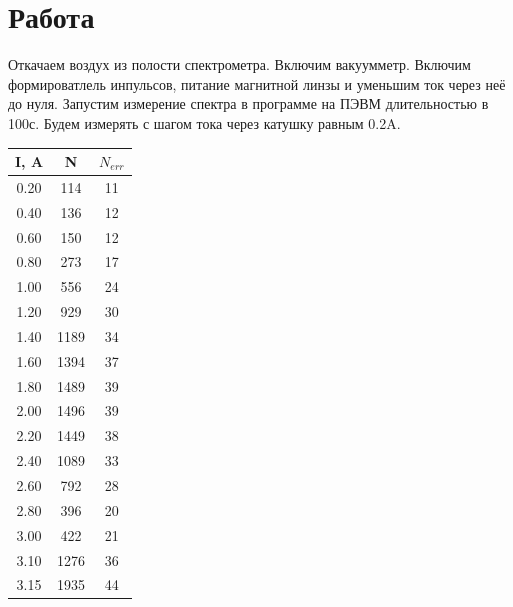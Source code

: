 \documentclass{article}
\begin{document}
\section{Работа}

Откачаем воздух из полости спектрометра. Включим вакуумметр. Включим формироватлель
инпульсов, питание магнитной линзы и уменьшим ток через неё до нуля. Запустим измерение
спектра в программе на ПЭВМ длительностью в 100с. Будем измерять с шагом тока через катушку равным 0.2A.

\begin{table}[h]
	\centering
\begin{tabular}{|c|c|c|}
\hline
I, A									    & N													& \(N_{err}\) \\\hline
0.20                      & 114                       & 11 \\\hline
0.40                      & 136                       & 12 \\\hline
0.60                      & 150                       & 12 \\\hline
0.80                      & 273                       & 17 \\\hline
1.00                      & 556                       & 24 \\\hline
1.20                      & 929                       & 30 \\\hline
1.40                      & 1189                      & 34 \\\hline
1.60                      & 1394                      & 37 \\\hline
1.80                      & 1489                      & 39 \\\hline
2.00                      & 1496                      & 39 \\\hline
2.20                      & 1449                      & 38 \\\hline
2.40                      & 1089                      & 33 \\\hline
2.60                      & 792                       & 28 \\\hline
2.80                      & 396                       & 20 \\\hline
3.00                      & 422                       & 21 \\\hline
3.10                      & 1276                      & 36 \\\hline
3.15                      & 1935                      & 44 \\\hline

\end{tabular}
\end{table}
\end{document}
